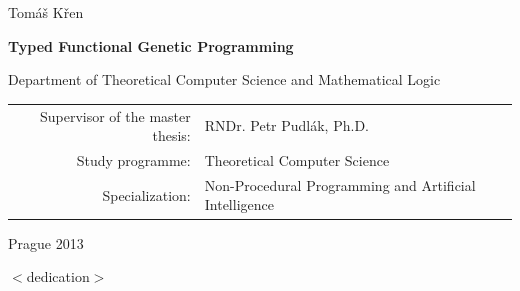 \documentclass[12pt,a4paper]{report}
\begin{document}
\begin{center}
{\LARGE Tomáš Křen}

\vspace{15mm}

{\LARGE\bfseries Typed Functional Genetic Programming}

\vfill

{\fontsize{0.46cm}{1em}\selectfont 
Department of Theoretical Computer Science and Mathematical Logic}

\vfill

\begin{tabular}{rl}

Supervisor of the master thesis: & RNDr. Petr Pudlák, Ph.D. \\
\noalign{\vspace{2mm}}
Study programme: & Theoretical Computer Science \\ %
\noalign{\vspace{2mm}}
Specialization: & 
{\fontsize{0.3cm}{1em}\selectfont 
Non-Procedural Programming and Artificial Intelligence} \\
\end{tabular}

\vfill

Prague 2013

\end{center}

\newpage




\noindent
$<$dedication$>$
\end{document}
